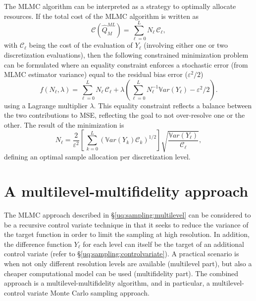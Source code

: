 The MLMC algorithm can be interpreted as a strategy to optimally allocate 
resources. If the total cost of the MLMC algorithm is written as  
\begin{equation}\label{EQ: MLMC cost}
\mathcal{C}(\hat{Q}^{ML}_{M}) = \sum_{\ell=0}^{L} N_\ell \, \mathcal{C}_{\ell},
\end{equation}
with $\mathcal{C}_{\ell}$ being the cost of the evaluation of $Y_\ell$ (involving either one or two discretization evaluations), then the following constrained minimization problem can be formulated where an equality constraint enforces a stochastic error (from MLMC estimator variance) equal to the residual bias error ($\varepsilon^2/2$)
\begin{equation}\label{EQ:mlmc_optimization}
 f(N_\ell,\lambda) = \sum_{\ell=0}^{L} N_\ell \, \mathcal{C}_{\ell} 
                   + \lambda \left( \sum_{\ell=0}^{L} N_\ell^{-1} \mathbb{V}ar\left({Y_\ell}\right) - \varepsilon^2/2 \right). 
\end{equation}
using a Lagrange multiplier $\lambda$.  This equality constraint reflects a balance between the two contributions to MSE, reflecting the goal to not over-resolve one or the other.  The result of the minimization is
\begin{equation}\label{EQ: MLMC nl}
N_{\ell} = \frac{2}{\varepsilon^2} \left[ \, \sum_{k=0}^L \left( \mathbb{V}ar\left(Y_k\right) \mathcal{C}_k \right)^{1/2} \right] 
               \sqrt{\frac{ \mathbb{V}ar\left({Y_\ell}\right) }{\mathcal{C}_{\ell}}},
\end{equation}
defining an optimal sample allocation per discretization level.


\section{A multilevel-multifidelity approach} \label{uq:sampling:mlmf}

The MLMC approach described in \S\ref{uq:sampling:multilevel} can be considered
to be a recursive control variate technique in that it seeks to reduce
the variance of the target function in order to limit the sampling at
high resolution. In addition, the difference function $Y_\ell$ for
each level can itself be the target of an additional control variate
(refer to \S\ref{uq:sampling:controlvariate}). A practical scenario is
when not only different resolution levels are available (multilevel
part), but also a cheaper computational model can be used
(multifidelity part). The combined approach is a
multilevel-multifidelity algorithm, and in particular, a
multilevel-control variate Monte Carlo sampling approach.

